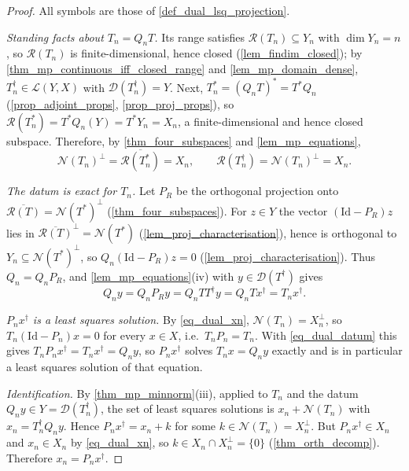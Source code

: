 \documentclass[a4paper]{report}
\theoremstyle{plain}
\theoremstyle{definition}
\theoremstyle{remark}
\newcommand{\Ll}{\mathcal{L}}
\newcommand{\Ran}{\mathcal{R}}
\newcommand{\Ker}{\mathcal{N}}
\newcommand{\Dom}{\mathcal{D}}
\newcommand{\Id}{\mathrm{Id}}
\newcommand{\dg}{^{\dagger}}
\begin{document}
\begin{proof}
  All symbols are those of \cref{def_dual_lsq_projection}.

  \emph{Standing facts about $T_n = Q_nT$.}  Its range satisfies $\Ran(T_n) \subseteq Y_n$
  with $\dim Y_n = n$, so $\Ran(T_n)$ is finite-dimensional, hence closed
  (\cref{lem_findim_closed}); by \cref{thm_mp_continuous_iff_closed_range} and
  \cref{lem_mp_domain_dense}, $T_n\dg \in \Ll(Y,X)$ with $\Dom(T_n\dg) = Y$.  Next,
  $T_n^{*} = (Q_nT)^{*} = T^{*}Q_n$ (\cref{prop_adjoint_props}, \cref{prop_proj_props}), so
  $\Ran(T_n^{*}) = T^{*}Q_n(Y) = T^{*}Y_n = X_n$, a finite-dimensional and hence closed
  subspace.  Therefore, by \cref{thm_four_subspaces} and \cref{lem_mp_equations},
  \begin{equation}\label{eq_dual_xn}
    \Ker(T_n)^{\perp} = \overline{\Ran(T_n^{*})} = X_n ,
    \qquad \Ran(T_n\dg) = \Ker(T_n)^{\perp} = X_n .
  \end{equation}

  \emph{The datum is exact for $T_n$.}  Let $P_R$ be the orthogonal projection onto
  $\overline{\Ran(T)} = \Ker(T^{*})^{\perp}$ (\cref{thm_four_subspaces}).  For $z \in Y$ the
  vector $(\Id - P_R)z$ lies in $\overline{\Ran(T)}^{\perp} = \Ker(T^{*})$
  (\cref{lem_proj_characterisation}), hence is orthogonal to
  $Y_n \subseteq \Ker(T^{*})^{\perp}$, so $Q_n(\Id - P_R)z = 0$
  (\cref{lem_proj_characterisation}).  Thus $Q_n = Q_nP_R$, and \cref{lem_mp_equations}(iv)
  with $y \in \Dom(T\dg)$ gives
  \begin{equation}\label{eq_dual_datum}
    Q_ny = Q_nP_Ry = Q_nTT\dg y = Q_nTx\dg = T_nx\dg .
  \end{equation}

  \emph{$P_nx\dg$ is a least squares solution.}  By \eqref{eq_dual_xn},
  $\Ker(T_n) = X_n^{\perp}$, so $T_n(\Id - P_n)x = 0$ for every $x \in X$, i.e.\
  $T_nP_n = T_n$.  With \eqref{eq_dual_datum} this gives
  $T_nP_nx\dg = T_nx\dg = Q_ny$, so $P_nx\dg$ solves $T_nx = Q_ny$ exactly and is in
  particular a least squares solution of that equation.

  \emph{Identification.}  By \cref{thm_mp_minnorm}(iii), applied to $T_n$ and the datum
  $Q_ny \in Y = \Dom(T_n\dg)$, the set of least squares solutions is
  $x_n + \Ker(T_n)$ with $x_n = T_n\dg Q_ny$.  Hence $P_nx\dg = x_n + k$ for some
  $k \in \Ker(T_n) = X_n^{\perp}$.  But $P_nx\dg \in X_n$ and $x_n \in X_n$ by
  \eqref{eq_dual_xn}, so $k \in X_n \cap X_n^{\perp} = \{0\}$
  (\cref{thm_orth_decomp}).  Therefore $x_n = P_nx\dg$.
\end{proof}
\end{document}

